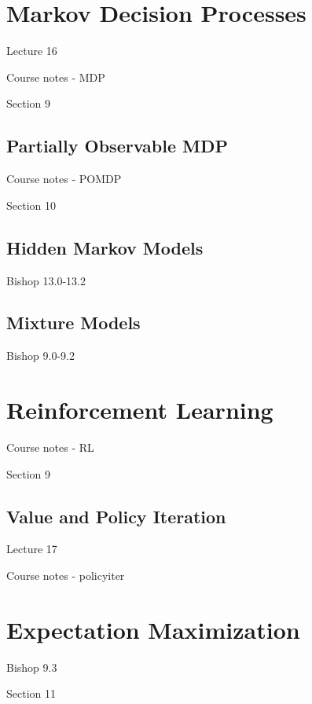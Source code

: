 \documentclass[11pt, oneside]{article}   	%
\begin{document}
\section{Markov Decision Processes}
Lecture 16

Course notes - MDP

Section 9

\subsection{Partially Observable MDP}
Course notes - POMDP

Section 10

\subsection{Hidden Markov Models}
Bishop 13.0-13.2

\subsection{Mixture Models}
Bishop 9.0-9.2

\section{Reinforcement Learning}
Course notes - RL

Section 9

\subsection{Value and Policy Iteration}
Lecture 17

Course notes - policyiter

\section{Expectation Maximization}

Bishop 9.3

Section 11
\end{document}
